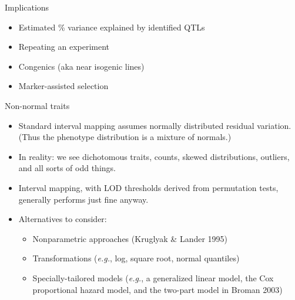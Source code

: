 \documentclass[12pt]{article}
\newcommand{\headsize}{\fontsize{35}{35} \selectfont}
\newcommand{\smallsize}{\fontsize{25}{30} \selectfont}
\newcommand{\smallersize}{\fontsize{20}{25} \selectfont}
\begin{document}
\newpage

\headsize \color{myyellow}
\hfill \begin{minipage}{5.75in}
\centering
Implications
\end{minipage}

\smallsize \color{mywhite}

\vspace{25mm}

\hfill
\begin{minipage}{10in}
\begin{itemize}
\setlength{\itemsep}{24pt}
\item Estimated \% variance explained by identified QTLs

\item Repeating an experiment

\item Congenics (aka near isogenic lines)

\item Marker-assisted selection
\end{itemize}
\end{minipage}



\newpage

\headsize \color{myyellow}
\hfill \begin{minipage}{5.75in}
\centering
Non-normal traits
\end{minipage}


\vspace{25mm}

\color{mywhite} \smallersize
\hfill \begin{minipage}{10in}
\begin{itemize}
\setlength{\rightskip}{0pt plus 1fil} %
\itemsep18pt
\item Standard interval mapping assumes normally distributed residual
variation.  (Thus the phenotype distribution is a mixture of normals.)
\item {\color{mypink} In reality}: we see dichotomous traits,
counts, skewed distributions, outliers, and all sorts of odd things.
\item Interval mapping, with LOD thresholds derived from permutation
tests, generally performs just fine anyway.
\item Alternatives to consider:
\begin{itemize}
\smallersize
\setlength{\rightskip}{0pt plus 1fil} %
    \item Nonparametric approaches {\color{myblue} (Kruglyak \& Lander 1995)}
    \item Transformations {\color{myblue} (\emph{e.g.}, log, square root, normal quantiles)}
    \item Specially-tailored models  {\color{myblue} (\emph{e.g.}, a generalized linear
    model, the Cox proportional hazard model, and the two-part model
    in Broman 2003)}
\end{itemize}
\end{itemize} \end{minipage}
\end{document}
